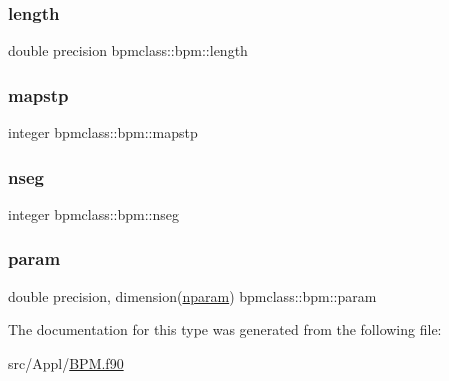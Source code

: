 \subsubsection{\texorpdfstring{length}{length}}
{\footnotesize\ttfamily double precision bpmclass\+::bpm\+::length}

\mbox{\label{structbpmclass_1_1bpm_a57b5d567476a69c20de780f6fb8d0a2e}} 
\subsubsection{\texorpdfstring{mapstp}{mapstp}}
{\footnotesize\ttfamily integer bpmclass\+::bpm\+::mapstp}

\mbox{\label{structbpmclass_1_1bpm_af47828f23a39ecfbef81048d780c4107}} 
\subsubsection{\texorpdfstring{nseg}{nseg}}
{\footnotesize\ttfamily integer bpmclass\+::bpm\+::nseg}

\mbox{\label{structbpmclass_1_1bpm_ab4cbff356dd68d8a0563cb3b1d4ae235}} 
\subsubsection{\texorpdfstring{param}{param}}
{\footnotesize\ttfamily double precision, dimension(\mbox{\hyperlink{namespacebpmclass_ac2f2f373976236d08c9c68de895950eb}{nparam}}) bpmclass\+::bpm\+::param}



The documentation for this type was generated from the following file\+:\begin{DoxyCompactItemize}
\item 
src/\+Appl/\mbox{\hyperlink{_b_p_m_8f90}{B\+P\+M.\+f90}}\end{DoxyCompactItemize}
